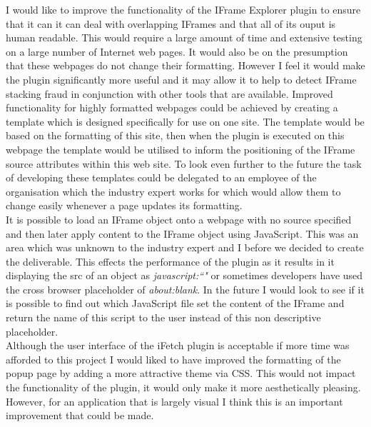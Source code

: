 \documentclass[12pt]{article}
\begin{document}
I would like to improve the functionality of the IFrame Explorer plugin to ensure that it can it can deal with overlapping IFrames and that all of its ouput is human readable. This would require a large amount of time and extensive testing on a large number of Internet web pages. It would also be on the presumption that these webpages do not change their formatting. However I feel it would make the plugin significantly more useful and it may allow it to help to detect IFrame stacking fraud in conjunction with other tools that are available. Improved functionality for highly formatted webpages could be achieved by creating a template which is designed specifically for use on one site. The template would be based on the formatting of this site, then when the plugin is executed on this webpage the template would be utilised to inform the positioning of the IFrame source attributes within this web site. To look even further to the future the task of developing these templates could be delegated to an employee of the organisation which the industry expert works for which would allow them to change easily whenever a page updates its formatting. \\

It is possible to load an IFrame object onto a webpage with no source specified and then later apply content to the IFrame object using JavaScript. This was an area which was unknown to the industry expert and I before we decided to create the deliverable. This effects the performance of the plugin as it results in it displaying the src of an object as \textit{javascript:``"} or sometimes developers have used the cross browser placeholder of \textit{about:blank}. In the future I would look to see if it is possible to find out which JavaScript file set the content of the IFrame and return the name of this script to the user instead of this non descriptive placeholder. \\

Although the user interface of the iFetch plugin is acceptable if more time was afforded to this project I would liked to have improved the formatting of the popup page by adding a more attractive theme via CSS. This would not impact the functionality of the plugin, it would only make it more aesthetically pleasing. However, for an application that is largely visual I think this is an important improvement that could be made. \\
\end{document}
